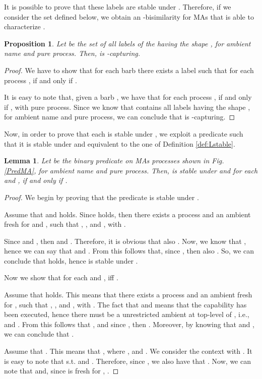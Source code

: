 \documentclass[copyright,creativecommons]{eptcs}
\newcommand{\<}{\langle}
\renewcommand{\>}{\rangle}
\newtheorem{lemma}{Lemma}{}
\newtheorem{proposition}{Proposition}{}
\begin{document}
It is possible to prove that these labels are stable under
. Therefore,
if we consider the set  defined below, we obtain an -bisimilarity for MAs
that is able to characterize .





\begin{proposition} \label{LMAO-capturing}\label{def:LMAs}
Let  be the set of all labels of the   having
the shape  , for  ambient name and  pure process.
Then,  is -capturing.
\end{proposition}

\begin{proof}
We have to show that for each barb  there exists a label 
such that for each process ,  if and only if .

It is easy to note that, given a barb , we have that for each process ,  if and only if ,
with  pure process. Since we know that  contains all
labels having the shape  , for 
ambient name and  pure process, we can conclude that  is
-capturing.
\end{proof}

Now, in order to prove that each  is stable under
, we exploit a predicate such that
it is stable under  and equivalent
to the one of Definition \ref{def:Lstable}.

\begin{lemma} \label{lemma:PredMA}
Let  be the binary predicate
on MAs processes shown in Fig. \ref{PredMA}, for  ambient name
and  pure process.
Then,  is stable under 
and for each  and ,  if and only if
.
\end{lemma}

\begin{proof}
We begin by proving that the predicate 
is stable under .

Assume that  and  holds.
Since  holds, then
there exists a process  and an ambient  fresh for  and ,
such that , ,
 and , with
.

Since  and , then
 and .
Therefore, it is obvious that also .
Now, we know that , hence we can say
that  and .
From this follows that, since , then also .
So, we can conclude that  holds, hence 
is stable under .

Now we show that for each  and ,  iff
.

Assume that  holds.
This means that there exists a process  and an ambient  fresh for ,
such that , ,
 and , with
.
The fact that  and  means that
the capability  has been executed, hence
there must be a unrestricted ambient  at top-level of , i.e.,
 and .
From this follows that ,
and since , then .
Moreover, by knowing that  and ,
we can conclude that .

Assume that . This means that
, where ,  and
. We consider the context  with . It is easy to note that  s.t.  and .
Therefore, since , we also have that . Now, we can note that  and, since  is
fresh for , .
\end{proof}
\end{document}
